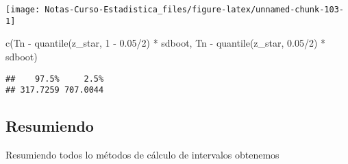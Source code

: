 \documentclass[
  12pt,
]{book}
\newenvironment{Shaded}{\begin{snugshade}}{\end{snugshade}}
\newcommand{\DecValTok}[1]{\textcolor[rgb]{0.00,0.00,0.81}{#1}}
\newcommand{\FloatTok}[1]{\textcolor[rgb]{0.00,0.00,0.81}{#1}}
\newcommand{\FunctionTok}[1]{\textcolor[rgb]{0.00,0.00,0.00}{#1}}
\newcommand{\NormalTok}[1]{#1}
\newcommand{\SpecialCharTok}[1]{\textcolor[rgb]{0.00,0.00,0.00}{#1}}
\theoremstyle{definition}
\theoremstyle{definition}
\theoremstyle{definition}
\theoremstyle{definition}
\theoremstyle{remark}
\begin{document}
\begin{center}\texttt{[image: Notas-Curso-Estadistica\_files/figure-latex/unnamed-chunk-103-1]} \end{center}

\begin{Shaded}
\begin{Highlighting}[]
\FunctionTok{c}\NormalTok{(Tn }\SpecialCharTok{{-}} \FunctionTok{quantile}\NormalTok{(z\_star, }\DecValTok{1} \SpecialCharTok{{-}} \FloatTok{0.05}\SpecialCharTok{/}\DecValTok{2}\NormalTok{) }\SpecialCharTok{*}\NormalTok{ sdboot, Tn }\SpecialCharTok{{-}}
    \FunctionTok{quantile}\NormalTok{(z\_star, }\FloatTok{0.05}\SpecialCharTok{/}\DecValTok{2}\NormalTok{) }\SpecialCharTok{*}\NormalTok{ sdboot)}
\end{Highlighting}
\end{Shaded}

\begin{verbatim}
##    97.5%     2.5% 
## 317.7259 707.0044
\end{verbatim}

\hypertarget{resumiendo}{%
\subsection{Resumiendo}\label{resumiendo}}

Resumiendo todos lo métodos de cálculo de intervalos obtenemos
\end{document}
